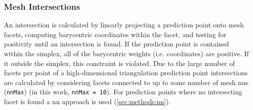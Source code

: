 \documentclass[preprint,12pt]{elsarticle}
\begin{document}
\subsubsection{Mesh Intersections}
\label{sec:methods:bary:int}
An intersection is calculated by linearly projecting a prediction point onto mesh facets, computing barycentric coordinates within the facet, and testing for positivity \cite{langerSphericalBarycentricCoordinates2006} until an intersection is found. If the prediction point is contained within the simplex, all of the barycentric weights (i.e. coordinates) are positive. If it outside the simplex, this constraint is violated. Due to the large number of facets per point of a high-dimensional
triangulation
prediction point intersections are calculated by considering facets connected to up to some number of mesh \glspl{nn} (\texttt{nnMax}) (in this work, \texttt{nnMax = 10}). For prediction points where no intersecting facet is found
a \gls{nn} approach is used (\cref{sec:methods:nn}).

\end{document}
